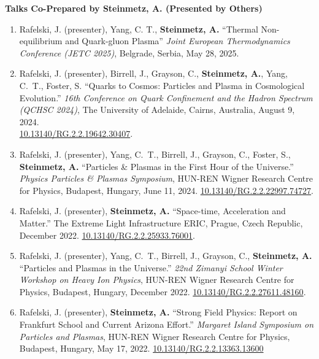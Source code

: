 \documentclass[11pt]{article}
\begin{document}
{\large\textbf{Talks Co-Prepared by Steinmetz, A. (Presented by Others)}}

\begin{enumerate}[leftmargin=*,nosep]
    \item Rafelski, J. (presenter), Yang, C. T., \textbf{Steinmetz, A.} ``Thermal Non-equilibrium and Quark-gluon Plasma'' \textit{Joint European Thermodynamics Conference (JETC 2025)}, Belgrade, Serbia, May 28, 2025.
    \item Rafelski, J. (presenter), Birrell, J., Grayson, C., \textbf{Steinmetz, A.}, Yang, C.~T., Foster, S. ``Quarks to Cosmos: Particles and Plasma in Cosmological Evolution.'' \textit{16th Conference on Quark Confinement and the Hadron Spectrum (QCHSC 2024)}, The University of Adelaide, Cairns, Australia, August 9, 2024.\\ \href{http://dx.doi.org/10.13140/RG.2.2.19642.30407}{10.13140/RG.2.2.19642.30407}.
    \item Rafelski, J. (presenter), Yang, C.~T., Birrell, J., Grayson, C., Foster, S., \textbf{Steinmetz, A.} ``Particles \& Plasmas in the First Hour of the Universe.'' \textit{Physics Particles \& Plasmas Symposium}, HUN-REN Wigner Research Centre for Physics, Budapest, Hungary, June 11, 2024. \href{http://dx.doi.org/10.13140/RG.2.2.22997.74727}{10.13140/RG.2.2.22997.74727}.
    \item Rafelski, J. (presenter), \textbf{Steinmetz, A.} ``Space-time, Acceleration and Matter.'' The Extreme Light Infrastructure ERIC, Prague, Czech Republic, December 2022. \href{http://dx.doi.org/10.13140/RG.2.2.25933.76001}{10.13140/RG.2.2.25933.76001}.
    \item Rafelski, J. (presenter), Yang, C.~T., Birrell, J., Grayson, C., \textbf{Steinmetz, A.} ``Particles and Plasmas in the Universe.'' \textit{22nd Zimanyi School Winter Workshop on Heavy Ion Physics}, HUN-REN Wigner Research Centre for Physics, Budapest, Hungary, December 2022. \href{http://dx.doi.org/10.13140/RG.2.2.27611.48160}{10.13140/RG.2.2.27611.48160}.
    \item Rafelski, J. (presenter), \textbf{Steinmetz, A.} ``Strong Field Physics: Report on Frankfurt School and Current Arizona Effort.'' \textit{Margaret Island Symposium on Particles and Plasmas}, HUN-REN Wigner Research Centre for Physics, Budapest, Hungary, May 17, 2022. \href{http://dx.doi.org/10.13140/RG.2.2.13363.13600}{10.13140/RG.2.2.13363.13600}
\end{enumerate}
\end{document}
